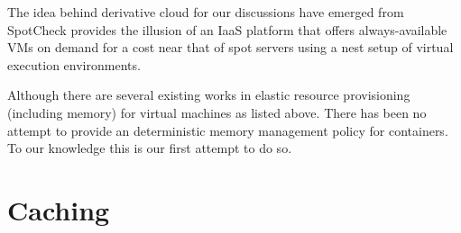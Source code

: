   The idea behind derivative cloud for our discussions have emerged from SpotCheck \cite{sharma2015spotcheck}  provides the illusion of an 
IaaS platform that offers always-available VMs on demand for a cost near that of spot servers using a nest setup of virtual execution 
environments. 

  Although there are several existing works in elastic resource provisioning (including memory) for virtual machines as listed above. There 
has been no attempt to provide an deterministic memory management policy for containers. To our knowledge this is our first attempt to do 
so. 


\section{Caching}

%     
%     
%       
%    